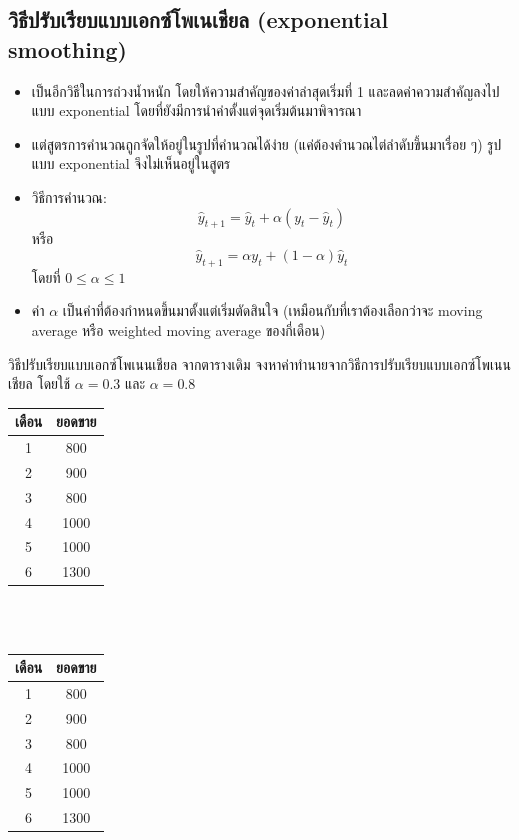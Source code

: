 \newpage
\subsection{วิธีปรับเรียบแบบเอกซ์โพเนเชียล (exponential smoothing)}
\begin{itemize}
    \item เป็นอีกวิธีในการถ่วงน้ำหนัก โดยให้ความสำคัญของค่าล่าสุดเริ่มที่ 1 และลดค่าความสำคัญลงไปแบบ exponential โดยที่ยังมีการนำค่าตั้งแต่จุดเริ่มต้นมาพิจารณา
    \item แต่สูตรการคำนวณถูกจัดให้อยู่ในรูปที่คำนวณได้ง่าย (แค่ต้องคำนวณไต่ลำดับขึ้นมาเรื่อย ๆ) รูปแบบ exponential จึงไม่เห็นอยู่ในสูตร
    \item วิธีการคำนวณ:
    \[
    \hat{y}_{t+1} = \hat{y}_{t} + \alpha(y_t - \hat{y}_{t})
    \]
    หรือ
    \[
    \hat{y}_{t+1} = \alpha y_{t} + (1-\alpha)\hat{y}_t
    \]
    โดยที่ $0 \leq \alpha \leq 1$
    \item ค่า $\alpha$ เป็นค่าที่ต้องกำหนดขึ้นมาตั้งแต่เริ่มตัดสินใจ (เหมือนกับที่เราต้องเลือกว่าจะ moving average หรือ weighted moving average ของกี่เดือน)
\end{itemize}
\begin{example}
    {วิธีปรับเรียบแบบเอกซ์โพเนนเชียล}{}
    จากตารางเดิม จงหาค่าทำนายจากวิธีการปรับเรียบแบบเอกซ์โพเนนเชียล โดยใช้ $\alpha=0.3$ และ $\alpha=0.8$
\end{example}
\begin{tabular}{|c|c|}
\hline
เดือน & ยอดขาย \\ \hline
1     & 800    \\ \hline
2     & 900    \\ \hline
3     & 800    \\ \hline
4     & 1000   \\ \hline
5     & 1000   \\ \hline
6     & 1300   \\ \hline
\end{tabular}\\
~
\vspace{1cm}\\
\noindent\begin{tabular}{|c|c|}
\hline
เดือน & ยอดขาย \\ \hline
1     & 800    \\ \hline
2     & 900    \\ \hline
3     & 800    \\ \hline
4     & 1000   \\ \hline
5     & 1000   \\ \hline
6     & 1300   \\ \hline
\end{tabular}


